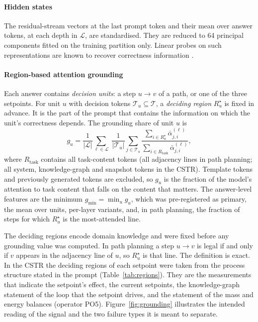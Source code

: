 \paragraph{Hidden states} The residual-stream vectors at the last prompt token and their mean over answer tokens,
at each depth in $\mathcal L$, are standardised. They are reduced to 64 principal components fitted on the
training partition only. Linear probes on such representations are known to recover correctness information
\citep{alain2016probes,azaria2023internal,orgad2025llms}.

\paragraph{Region-based attention grounding} Each answer contains \emph{decision units}: a step $u\to v$ of a
path, or one of the three setpoints. For unit $u$ with decision tokens $\mathcal T_u\subseteq\mathcal T$, a
\emph{deciding region} $R^{\star}_u$ is fixed in advance. It is the part of the prompt that contains the
information on which the unit's correctness depends. The grounding share of unit $u$ is
\begin{equation}\label{eq:grounding}
g_u=\frac{1}{|\mathcal L|}\sum_{\ell\in\mathcal L}\;\frac{1}{|\mathcal T_u|}\sum_{j\in\mathcal T_u}
\frac{\sum_{i\in R^{\star}_u}\bar\alpha^{(\ell)}_{j,i}}{\sum_{i\in R_{\mathrm{task}}}\bar\alpha^{(\ell)}_{j,i}},
\end{equation}
where $R_{\mathrm{task}}$ contains all task-content tokens (all adjacency lines in path planning; all system,
knowledge-graph and snapshot tokens in the CSTR). Template tokens and previously generated tokens are excluded,
so $g_u$ is the fraction of the model's attention to task content that falls on the content that matters. The
answer-level features are the minimum $g_{\min}=\min_u g_u$, which was pre-registered as primary, the mean over
units, per-layer variants, and, in path planning, the fraction of steps for which $R^{\star}_u$ is the
most-attended line.

The deciding regions encode domain knowledge and were fixed before any grounding value was computed. In path
planning a step $u\to v$ is legal if and only if $v$ appears in the adjacency line of $u$, so $R^{\star}_u$ is that
line. The definition is exact. In the CSTR the deciding regions of each setpoint were taken from the process
structure stated in the prompt (Table~\ref{tab:regions}). They are the measurements that indicate the setpoint's
effect, the current setpoints, the knowledge-graph statement of the loop that the setpoint drives, and the
statement of the mass and energy balances (operator PO5). Figure~\ref{fig:grounding} illustrates the intended
reading of the signal and the two failure types it is meant to separate.

